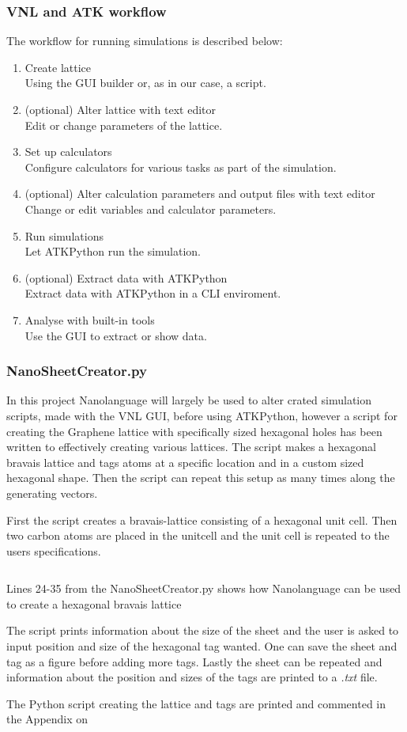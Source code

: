 \subsubsection{VNL and ATK workflow}
The workflow for running simulations is described below:
\begin{enumerate}
 \item Create lattice\\
 Using the GUI builder or, as in our case, a script.
 \item (optional) Alter lattice with text editor\\
 Edit or change parameters of the lattice.
 \item Set up calculators\\
 Configure calculators for various tasks as part of the simulation.
 \item (optional) Alter calculation parameters and output files with text editor\\
 Change or edit variables and calculator parameters.
 \item Run simulations\\
 Let ATKPython run the simulation.
 \item (optional) Extract data with ATKPython\\
 Extract data with ATKPython in a CLI enviroment.
 \item Analyse with built-in tools\\
 Use the GUI to extract or show data.
\end{enumerate}
\subsubsection{NanoSheetCreator.py}
In this project Nanolanguage will largely be used to alter crated simulation scripts, made with the VNL GUI, before using ATKPython, however a script for creating the Graphene lattice with specifically sized hexagonal holes has been written to effectively creating various lattices. The script makes a hexagonal bravais lattice and tags atoms at a specific location and in a custom sized hexagonal shape. Then the script can repeat this setup as many times along the generating vectors.

First the script creates a bravais-lattice consisting of a hexagonal unit cell. Then two carbon atoms are placed in the unitcell and the unit cell is repeated to the users specifications.
\onecolumngrid


\begin{listing}
    \inputminted[python3=true,bgcolor=Black,linenos=true,firstline=24,lastline=35]{python}{VNL/PythonScripts/NanoSheetCreator.py}
    \caption{Lines 24-35 from the NanoSheetCreator.py shows how    Nanolanguage can be used to create a hexagonal bravais lattice}
    \label{listing1}
\end{listing}
\twocolumngrid
The script prints information about the size of the sheet and the user is asked to input position and size of the hexagonal tag wanted. One can save the sheet and tag as a figure before adding more tags. Lastly the sheet can be repeated and information about the position and sizes of the tags are printed to a \textit{.txt} file.

The Python script creating the lattice and tags are printed and commented in the Appendix on 
